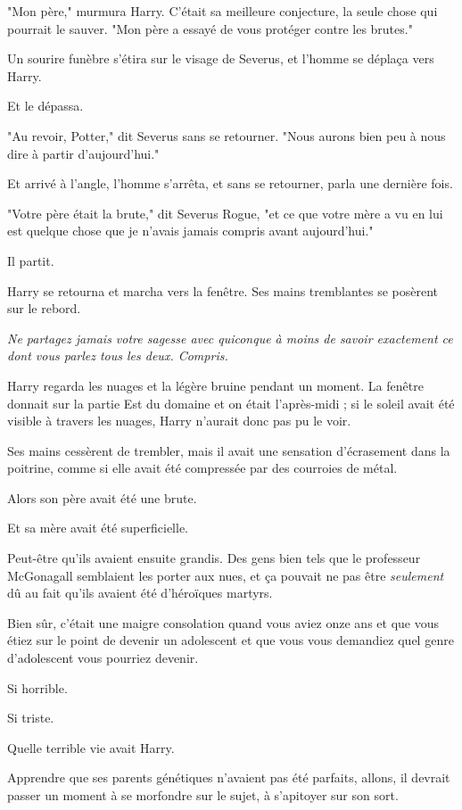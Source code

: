 "Mon père," murmura Harry. C'était sa meilleure conjecture, la seule chose qui pourrait le sauver. "Mon père a essayé de vous protéger contre les brutes."

Un sourire funèbre s'étira sur le visage de Severus, et l'homme se déplaça vers Harry.

Et le dépassa.

"Au revoir, Potter," dit Severus sans se retourner. "Nous aurons bien peu à nous dire à partir d'aujourd'hui."

Et arrivé à l'angle, l'homme s'arrêta, et sans se retourner, parla une dernière fois.

"Votre père était la brute," dit Severus Rogue, "et ce que votre mère a vu en lui est quelque chose que je n'avais jamais compris avant aujourd'hui."

Il partit.

Harry se retourna et marcha vers la fenêtre. Ses mains tremblantes se posèrent sur le rebord.

\emph{Ne partagez jamais votre sagesse avec quiconque à moins de savoir exactement ce dont vous parlez tous les deux. Compris.} 

Harry regarda les nuages et la légère bruine pendant un moment. La fenêtre donnait sur la partie Est du domaine et on était l'après-midi ; si le soleil avait été visible à travers les nuages, Harry n'aurait donc pas pu le voir.

Ses mains cessèrent de trembler, mais il avait une sensation d'écrasement dans la poitrine, comme si elle avait été compressée par des courroies de métal.

Alors son père avait été une brute.

Et sa mère avait été superficielle.

Peut-être qu'ils avaient ensuite grandis. Des gens bien tels que le professeur McGonagall semblaient les porter aux nues, et ça pouvait ne pas être \emph{seulement}  dû au fait qu'ils avaient été d'héroïques martyrs.

Bien sûr, c'était une maigre consolation quand vous aviez onze ans et que vous étiez sur le point de devenir un adolescent et que vous vous demandiez quel genre d'adolescent vous pourriez devenir.

Si horrible.

Si triste.

Quelle terrible vie avait Harry.

Apprendre que ses parents génétiques n'avaient pas été parfaits, allons, il devrait passer un moment à se morfondre sur le sujet, à s'apitoyer sur son sort.

